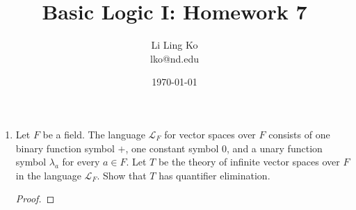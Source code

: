 \documentclass{article}
\begin{document}
\title{Basic Logic I: Homework 7}
\author{Li Ling Ko\\ lko@nd.edu}
\date{\today}
\maketitle

\begin{enumerate}[label={\bf Q\arabic*:}]
  \item Let $F$ be a field. The language $\mathcal{L}_F$ for vector spaces
    over $F$ consists of one binary function symbol $+$, one constant
    symbol $0$, and a unary function symbol $\lambda_a$ for every $a\in F$.
    Let $T$ be the theory of infinite vector spaces over $F$ in the
    language $\mathcal{L}_F$. Show that $T$ has quantifier elimination.

    \begin{proof}
    \end{proof}
\end{enumerate}
\end{document}
